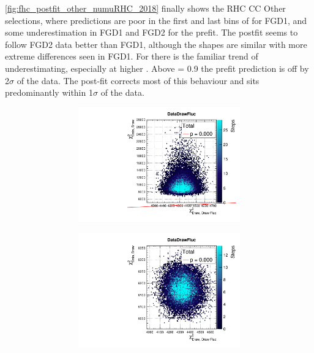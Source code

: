 \autoref{fig:fhc_postfit_other_numuRHC_2018} finally shows the \numu RHC CC Other selections, where predictions are poor in the first and last bins of \pmu for FGD1, and some underestimation in FGD1 and FGD2 for the prefit. The postfit seems to follow FGD2 data better than FGD1, although the shapes are similar with more extreme differences seen in FGD1. For \cosmu there is the familiar trend of underestimating, especially at higher \cosmu. Above \cosmu= 0.9 the prefit prediction is off by 2$\sigma$ of the data. The post-fit corrects most of this behaviour and sits predominantly within 1$\sigma$ of the data.
\begin{figure}[h]
	\begin{subfigure}[t]{\textwidth}
		\begin{subfigure}[t]{0.24\textwidth}
			\includegraphics[width=\textwidth, trim={0mm 0mm 0mm 8mm}, clip,page=136]{figures/mach3/2018/data/2018a_FixedCov_RedCov_Mpi_Data_merge_PriorPred_procs}
		\end{subfigure}
		\begin{subfigure}[t]{0.24\textwidth}
			\includegraphics[width=\textwidth, trim={0mm 0mm 0mm 8mm}, clip,page=136]{figures/mach3/2018/data/2018a_FixedCov_RedCov_Mpi_Data_merge_PostPredStore_FullLLH_procs}

\end{subfigure}
\end{subfigure}
\end{figure}
